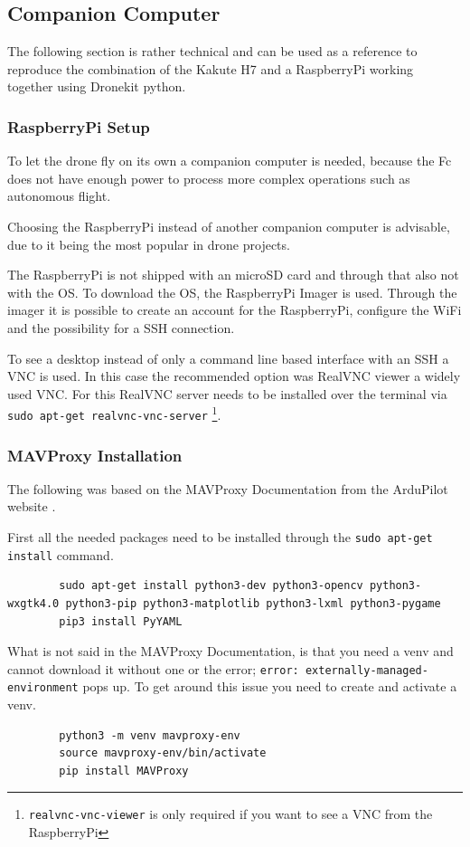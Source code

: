 \documentclass[svgnames]{article}
\begin{document}
	\subsection{Companion Computer}
	The following section is rather technical and can be used as a reference to reproduce the combination of the Kakute H7 and a RaspberryPi working together using Dronekit python.
	\subsubsection{RaspberryPi Setup}
	
	To let the drone fly on its own a companion computer is needed, because the \gls{Fc} does not have enough power to process more complex operations such as autonomous flight.
	
	Choosing the RaspberryPi instead of another companion computer is advisable, due to it being the most popular in drone projects.
	
	The RaspberryPi is not shipped with an microSD card and through that also not with the \gls{OS}. To download the \gls{OS}, the RaspberryPi Imager is used. Through the imager it is possible to create an account for the RaspberryPi,  configure the WiFi and the possibility for a \gls{SSH} connection. 

	
	To see a desktop instead of only a command line based interface with an \gls{SSH} a \gls{VNC} is used. In this case the recommended option was RealVNC viewer a widely used \gls{VNC}. For this RealVNC server needs to be installed over the terminal via \lstinline|sudo apt-get realvnc-vnc-server| \cite{ionisvnctutorial}\footnote{\lstinline|realvnc-vnc-viewer| is only required if you want to see a VNC from the RaspberryPi}.
	
	\subsubsection{MAVProxy Installation}
	The following was based on the MAVProxy Documentation from the ArduPilot website  \cite{MavProxydocs}.
	
	First all the needed packages need to be installed through the \lstinline|sudo apt-get install| command. 
	\begin{lstlisting}
		sudo apt-get install python3-dev python3-opencv python3-wxgtk4.0 python3-pip python3-matplotlib python3-lxml python3-pygame
		pip3 install PyYAML
	\end{lstlisting}

	What is not said in the MAVProxy Documentation, is that you need a \gls{venv} and cannot download it without one or the error; \lstinline|error: externally-managed-environment| pops up. To get around this issue you need to create and activate a \gls{venv}.
	\begin{lstlisting}
		python3 -m venv mavproxy-env
		source mavproxy-env/bin/activate
		pip install MAVProxy
	\end{lstlisting} 
	
\end{document}
